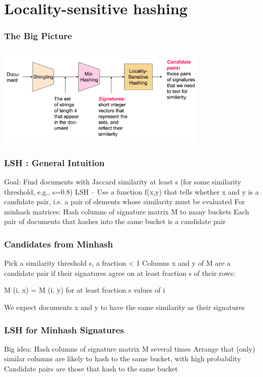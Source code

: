 \documentclass[svgnames]{beamer}
\begin{document}
  
\section{Locality-sensitive hashing}

  
\begin{frame} \frametitle{The Big Picture}

\includegraphics[width=10cm]{overall}

\end{frame}

  
\begin{frame} \frametitle{LSH : General Intuition}

Goal: Find documents with Jaccard similarity at least s (for some similarity threshold, e.g., s=0.8)
LSH -- Use a function f(x,y) that tells whether x and y is a candidate pair, i.e. a pair of elements whose similarity must be evaluated
For minhash matrices:
  Hash columns of signature matrix M to many buckets
  Each pair of documents that hashes into the same bucket is a candidate pair
  
\end{frame}

  
\begin{frame} \frametitle{Candidates from Minhash}

Pick a similarity threshold s, a fraction < 1
Columns x and y of M are a candidate pair if their signatures agree on at least fraction s of their rows: 

M (i, x) = M (i, y) for at least fraction s values of i

We expect documents x and y to have the same similarity as their signatures

\end{frame}

  
\begin{frame} \frametitle{LSH for Minhash Signatures}

Big idea: Hash columns of signature matrix M several times
Arrange that (only) similar columns are likely to hash to the same bucket, with high probability
Candidate pairs are those that hash to the same bucket

\end{frame}
\end{document}
